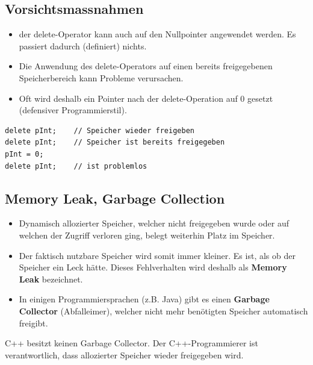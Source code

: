 \subsection{Vorsichtsmassnahmen}
\begin{itemize}
	\item der delete-Operator kann auch auf den Nullpointer angewendet werden. Es passiert dadurch (definiert) nichts.
	\item Die Anwendung des delete-Operators auf einen bereits freigegebenen Speicherbereich kann Probleme verursachen.
	\item Oft wird deshalb ein Pointer nach der delete-Operation auf 0 gesetzt (defensiver Programmierstil).
\end{itemize}
\vspace{-\baselineskip}
\begin{minipage}{\linewidth}
\begin{lstlisting}
delete pInt;	// Speicher wieder freigeben
delete pInt;	// Speicher ist bereits freigegeben
pInt = 0;
delete pInt;	// ist problemlos
\end{lstlisting}
\end{minipage}

\subsection{Memory Leak, Garbage Collection}
\begin{itemize}
	\item Dynamisch allozierter Speicher, welcher nicht freigegeben wurde oder auf welchen der Zugriff verloren ging, belegt weiterhin Platz im Speicher.
	\item Der faktisch nutzbare Speicher wird somit immer kleiner. Es ist, als ob der Speicher ein Leck hätte. Dieses Fehlverhalten wird deshalb als \textbf{Memory Leak} bezeichnet.
	\item In einigen Programmiersprachen (z.B. Java) gibt es einen \textbf{Garbage Collector} (Abfalleimer), welcher nicht mehr benötigten Speicher automatisch freigibt.
\end{itemize}
\begin{achtung}
C++ besitzt keinen Garbage Collector. Der C++-Programmierer ist verantwortlich, dass allozierter Speicher wieder freigegeben wird.
\end{achtung}

